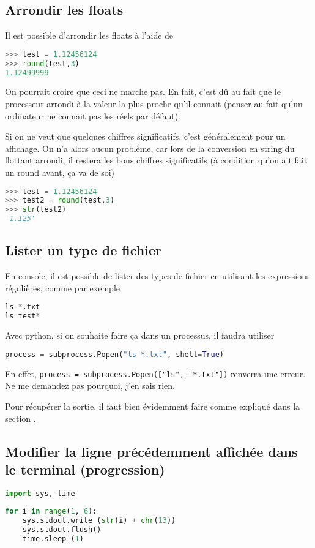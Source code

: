 \documentclass[a4paper,twoside]{article}
\begin{document}
\subsection{Arrondir les floats}
Il est possible d'arrondir les floats à l'aide de
\begin{lstlisting}[language=python]
>>> test = 1.12456124
>>> round(test,3)
1.12499999
\end{lstlisting}

On pourrait croire que ceci ne marche pas. En fait, c'est dû au fait que le processeur arrondi à la valeur la plus proche qu'il connait (penser au fait qu'un ordinateur ne connait pas les réels par défaut).

Si on ne veut que quelques chiffres significatifs, c'est généralement pour un affichage. On n'a alors aucun problème, car lors de la conversion en string du flottant arrondi, il restera les bons chiffres significatifs (à condition qu'on ait fait un round avant, ça va de soi)
\begin{lstlisting}[language=python]
>>> test = 1.12456124
>>> test2 = round(test,3)
>>> str(test2)
'1.125'
\end{lstlisting}

\subsection{Lister un type de fichier}
En console, il est possible de lister des types de fichier en utilisant les expressions régulières, comme par exemple
\begin{lstlisting}[language=python]
ls *.txt
ls test*
\end{lstlisting}

Avec python, si on souhaite faire ça dans un processus, il faudra utiliser
\begin{lstlisting}[language=python]
process = subprocess.Popen("ls *.txt", shell=True)
\end{lstlisting}

En effet, \verb|process = subprocess.Popen(["ls", "*.txt"])| renverra une erreur. Ne me demandez pas pourquoi, j'en sais rien.

\begin{remarque}
Pour récupérer la sortie, il faut bien évidemment faire comme expliqué dans la section .
\end{remarque}

\subsection{Modifier la ligne précédemment affichée dans le terminal (progression)}	
\begin{lstlisting}[language=python]
import sys, time
 
for i in range(1, 6):
    sys.stdout.write (str(i) + chr(13))
    sys.stdout.flush()
    time.sleep (1)
\end{lstlisting}
\end{document}

